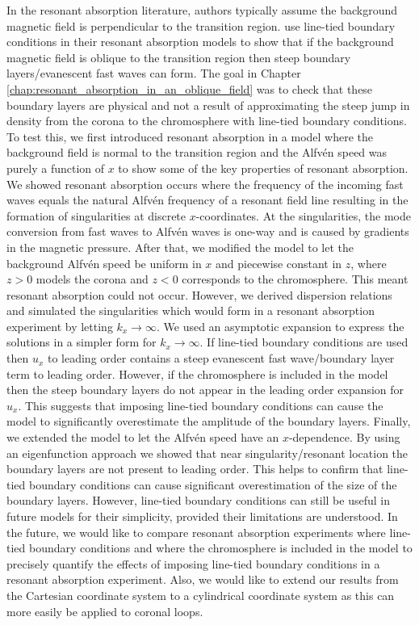 In the resonant absorption literature, authors typically assume the background magnetic field is perpendicular to the transition region. \citet{Halberstadt1993,Halberstadt1995,Arregui2003} use line-tied boundary conditions in their resonant absorption models to show that if the background magnetic field is oblique to the transition region then steep boundary layers/evanescent fast waves can form. The goal in Chapter \ref{chap:resonant_absorption_in_an_oblique_field} was to check that these boundary layers are physical and not a result of approximating the steep jump in density from the corona to the chromosphere with line-tied boundary conditions. To test this, we first introduced resonant absorption in a model where the background field is normal to the transition region and the Alfv\'en speed was purely a function of $x$ to show some of the key properties of resonant absorption. We showed resonant absorption occurs where the frequency of the incoming fast waves equals the natural Alfv\'en frequency of a resonant field line resulting in the formation of singularities at discrete $x$-coordinates. At the singularities, the mode conversion from fast waves to Alfv\'en waves is one-way and is caused by gradients in the magnetic pressure. After that, we modified the model to let the background Alfv\'en speed be uniform in $x$ and piecewise constant in $z$, where $z>0$ models the corona and $z<0$ corresponds to the chromosphere. This meant resonant absorption could not occur. However, we derived dispersion relations and simulated the singularities which would form in a resonant absorption experiment by letting $k_x\rightarrow \infty$. We used an asymptotic expansion to express the solutions in a simpler form for $k_x\rightarrow \infty$. If line-tied boundary conditions are used then $u_x$ to leading order contains a steep evanescent fast wave/boundary layer term to leading order. However, if the chromosphere is included in the model then the steep boundary layers do not appear in the leading order expansion for $u_x$. This suggests that imposing line-tied boundary conditions can cause the model to significantly overestimate the amplitude of the boundary layers. Finally, we extended the model to let the Alfv\'en speed have an $x$-dependence. By using an eigenfunction approach we showed that near singularity/resonant location the boundary layers are not present to leading order. This helps to confirm that line-tied boundary conditions can cause significant overestimation of the size of the boundary layers. However, line-tied boundary conditions can still be useful in future models for their simplicity, provided their limitations are understood. In the future, we would like to compare resonant absorption experiments where line-tied boundary conditions and where the chromosphere is included in the model to precisely quantify the effects of imposing line-tied boundary conditions in a resonant absorption experiment. Also, we would like to extend our results from the Cartesian coordinate system to a cylindrical coordinate system as this can more easily be applied to coronal loops.

